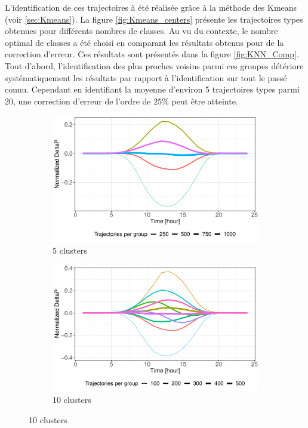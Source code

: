 \documentclass[12pt, french]{report}
\begin{document}
L'identification de ces trajectoires à été réalisée grâce à la méthode des Kmeans (voir \ref{sec:Kmeans}). La figure \ref{fig:Kmeans_centers} présente les trajectoires types obtenues pour différents nombres de classes. Au vu du contexte, le nombre optimal de classes a été choisi en comparant les résultats obtenus pour de la correction d'erreur. Ces résultats sont présentés dans la figure \ref{fig:KNN_Comp}. Tout d'abord, l'identification des plus proches voisins parmi ces groupes détériore systématiquement les résultats par rapport à l'identification sur tout le passé connu. Cependant en identifiant la moyenne d'environ 5 trajectoires types parmi 20, une correction d'erreur de l'ordre de $25 \%$ peut être atteinte.



\begin{figure}[htbp] 
	\begin{subfigure}[b]{0.5\linewidth}
		\centering
		\includegraphics[width=0.9\linewidth]{Images/PV/Kmeans/Kmeans5Clusts.pdf} 
		\caption{5 clusters} 
	\end{subfigure}%
	\begin{subfigure}[b]{0.5\linewidth}
		\centering
		\includegraphics[width=0.9\linewidth]{Images/PV/Kmeans/Kmeans10Clusts.pdf} 
		\caption{10 clusters} 
	\end{subfigure}
	

\end{figure}
\end{document}
